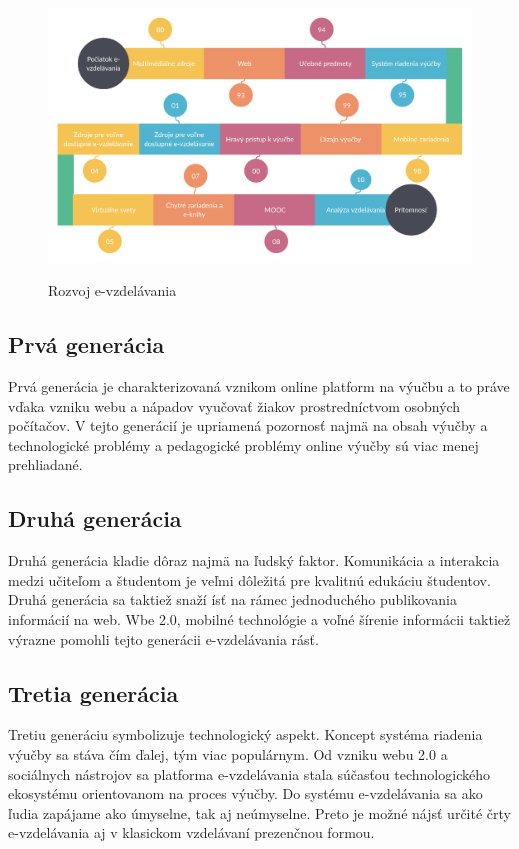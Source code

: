 \documentclass[10pt,slovak,a4paper]{article}
\begin{document}
	\begin{figure}
		\centering
		\includegraphics[width = \textwidth]{Obrazky/diagram.png}
		\caption{Rozvoj e-vzdelávania}
		\label{obrazok-casovyDiag}
		\cite{conole}
	\end{figure}

	\subsection{Prvá generácia}
	Prvá generácia je charakterizovaná vznikom online platform na výučbu a to práve vďaka vzniku webu a nápadov vyučovať žiakov prostredníctvom osobných počítačov. V tejto generácií je upriamená pozornosť najmä na obsah výučby a technologické problémy a pedagogické problémy online výučby sú viac menej prehliadané.
	\cite{main}

	\subsection{Druhá generácia}
	Druhá generácia kladie dôraz najmä na ľudský faktor. Komunikácia a interakcia medzi učiteľom a študentom je veľmi dôležitá pre kvalitnú edukáciu študentov. Druhá generácia sa taktiež snaží ísť na rámec jednoduchého publikovania informácií na web. Wbe 2.0, mobilné technológie a voľné šírenie informácii taktiež výrazne pomohli tejto generácii e-vzdelávania rásť.
	\cite{main}
	
	\subsection{Tretia generácia}
	Tretiu generáciu symbolizuje technologický aspekt. Koncept systéma riadenia výučby sa stáva čím ďalej, tým viac populárnym. Od vzniku webu 2.0 a sociálnych nástrojov sa platforma e-vzdelávania stala súčasťou technologického ekosystému orientovanom na proces výučby. Do systému e-vzdelávania sa ako ľudia zapájame ako úmyselne, tak aj neúmyselne. Preto je možné nájsť určité črty e-vzdelávania aj v klasickom vzdelávaní prezenčnou formou.
\end{document}
